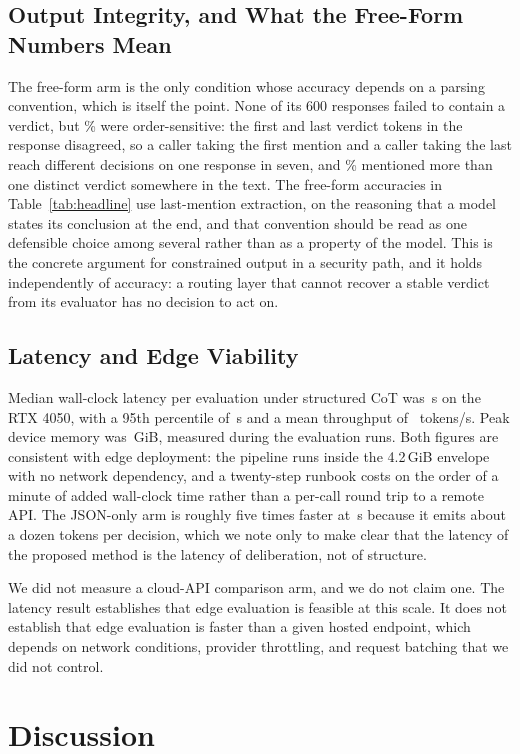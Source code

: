 \documentclass[conference]{IEEEtran}
\begin{document}
\subsection{Output Integrity, and What the Free-Form Numbers Mean}
The free-form arm is the only condition whose accuracy depends on a parsing convention, which is itself the point. None of its 600 responses failed to contain a verdict, but \AmbNaive\% were order-sensitive: the first and last verdict tokens in the response disagreed, so a caller taking the first mention and a caller taking the last reach different decisions on one response in seven, and \MultiNaive\% mentioned more than one distinct verdict somewhere in the text. The free-form accuracies in Table~\ref{tab:headline} use last-mention extraction, on the reasoning that a model states its conclusion at the end, and that convention should be read as one defensible choice among several rather than as a property of the model. This is the concrete argument for constrained output in a security path, and it holds independently of accuracy: a routing layer that cannot recover a stable verdict from its evaluator has no decision to act on.

\subsection{Latency and Edge Viability}
Median wall-clock latency per evaluation under structured CoT was \LatMedCot\,s on the RTX 4050, with a 95th percentile of \LatPCot\,s and a mean throughput of \TokSCot\ tokens/s. Peak device memory was \VRAMPeak\,GiB, measured during the evaluation runs. Both figures are consistent with edge deployment: the pipeline runs inside the 4.2\,GiB envelope with no network dependency, and a twenty-step runbook costs on the order of a minute of added wall-clock time rather than a per-call round trip to a remote API. The JSON-only arm is roughly five times faster at \LatMedZero\,s because it emits about a dozen tokens per decision, which we note only to make clear that the latency of the proposed method is the latency of deliberation, not of structure.

We did not measure a cloud-API comparison arm, and we do not claim one. The latency result establishes that edge evaluation is feasible at this scale. It does not establish that edge evaluation is faster than a given hosted endpoint, which depends on network conditions, provider throttling, and request batching that we did not control.

\section{Discussion}
\end{document}
